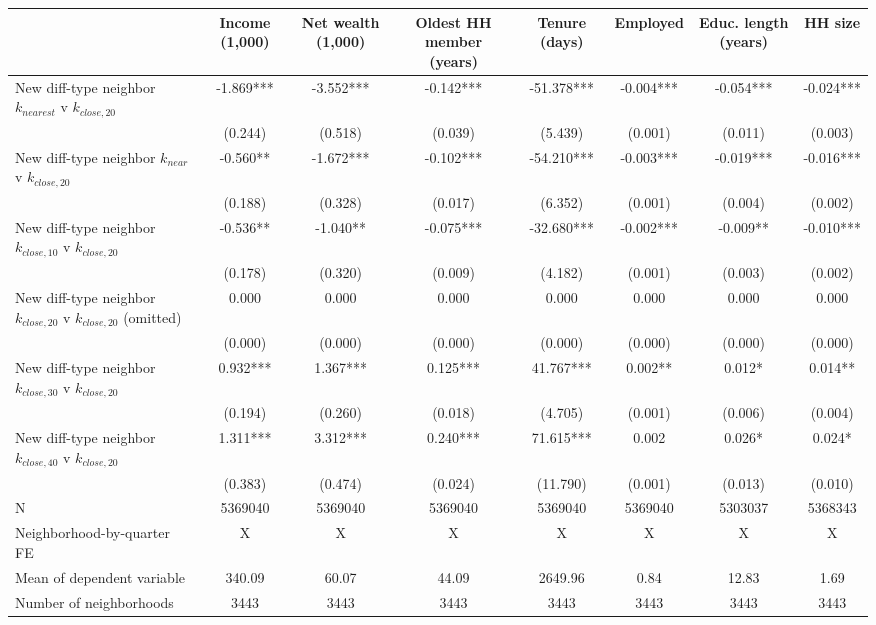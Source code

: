 \begin{tabular}[t]{lccccccc}
\toprule
  & Income (1,000) & Net wealth (1,000) & Oldest HH member (years) & Tenure (days) & Employed & Educ. length (years) & HH size\\
\midrule
New diff-type neighbor $k_{nearest}$ v $k_{close,20}$ & -1.869*** & -3.552*** & -0.142*** & -51.378*** & -0.004*** & -0.054*** & -0.024***\\
 & (0.244) & (0.518) & (0.039) & (5.439) & (0.001) & (0.011) & (0.003)\\
New diff-type neighbor $k_{near}$ v $k_{close,20}$ & -0.560** & -1.672*** & -0.102*** & -54.210*** & -0.003*** & -0.019*** & -0.016***\\
 & (0.188) & (0.328) & (0.017) & (6.352) & (0.001) & (0.004) & (0.002)\\
New diff-type neighbor $k_{close,10}$ v $k_{close,20}$ & -0.536** & -1.040** & -0.075*** & -32.680*** & -0.002*** & -0.009** & -0.010***\\
 & (0.178) & (0.320) & (0.009) & (4.182) & (0.001) & (0.003) & (0.002)\\
New diff-type neighbor $k_{close ,20}$ v $k_{close ,20}$ (omitted) & 0.000 & 0.000 & 0.000 & 0.000 & 0.000 & 0.000 & 0.000\\
 & (0.000) & (0.000) & (0.000) & (0.000) & (0.000) & (0.000) & (0.000)\\
New diff-type neighbor $k_{close,30}$ v $k_{close,20}$ & 0.932*** & 1.367*** & 0.125*** & 41.767*** & 0.002** & 0.012* & 0.014**\\
 & (0.194) & (0.260) & (0.018) & (4.705) & (0.001) & (0.006) & (0.004)\\
New diff-type neighbor $k_{close,40}$ v $k_{close,20}$ & 1.311*** & 3.312*** & 0.240*** & 71.615*** & 0.002 & 0.026* & 0.024*\\
 & (0.383) & (0.474) & (0.024) & (11.790) & (0.001) & (0.013) & (0.010)\\
\midrule
N & 5369040 & 5369040 & 5369040 & 5369040 & 5369040 & 5303037 & 5368343\\
Neighborhood-by-quarter FE & X & X & X & X & X & X & X\\
Mean of dependent variable & 340.09 & 60.07 & 44.09 & 2649.96 & 0.84 & 12.83 & 1.69\\
Number of neighborhoods & 3443 & 3443 & 3443 & 3443 & 3443 & 3443 & 3443\\
\bottomrule
\end{tabular}